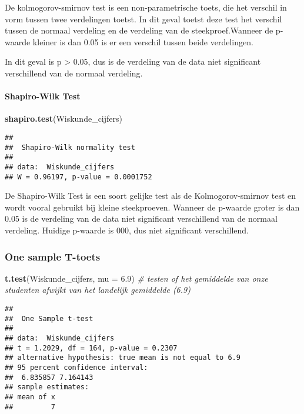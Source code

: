 \documentclass[]{article}
\newenvironment{Shaded}{\begin{snugshade}}{\end{snugshade}}
\newcommand{\CommentTok}[1]{\textcolor[rgb]{0.56,0.35,0.01}{\textit{#1}}}
\newcommand{\DataTypeTok}[1]{\textcolor[rgb]{0.13,0.29,0.53}{#1}}
\newcommand{\FloatTok}[1]{\textcolor[rgb]{0.00,0.00,0.81}{#1}}
\newcommand{\KeywordTok}[1]{\textcolor[rgb]{0.13,0.29,0.53}{\textbf{#1}}}
\newcommand{\NormalTok}[1]{#1}
\let\oldparagraph\paragraph
\renewcommand{\paragraph}[1]{\oldparagraph{#1}\mbox{}}
\begin{document}
De kolmogorov-smirnov test is een non-parametrische toets, die het
verschil in vorm tussen twee verdelingen toetst. In dit geval toetst
deze test het verschil tussen de normaal verdeling en de verdeling van
de steekproef.Wanneer de p-waarde kleiner is dan 0.05 is er een verschil
tussen beide verdelingen.

In dit geval is p \textgreater{} 0.05, dus is de verdeling van de data
niet significant verschillend van de normaal verdeling.

\hypertarget{shapiro-wilk-test}{%
\paragraph{Shapiro-Wilk Test}\label{shapiro-wilk-test}}

\begin{Shaded}
\begin{Highlighting}[]
\KeywordTok{shapiro.test}\NormalTok{(Wiskunde_cijfers)}
\end{Highlighting}
\end{Shaded}

\begin{verbatim}
## 
##  Shapiro-Wilk normality test
## 
## data:  Wiskunde_cijfers
## W = 0.96197, p-value = 0.0001752
\end{verbatim}

De Shapiro-Wilk Test is een soort gelijke test als de Kolmogorov-smirnov
test en wordt vooral gebruikt bij kleine steekproeven. Wanneer de
p-waarde groter is dan 0.05 is de verdeling van de data niet significant
verschillend van de normaal verdeling. Huidige p-waarde is 000, dus niet
significant verschillend.

\hypertarget{one-sample-t-toets}{%
\subsubsection{One sample T-toets}\label{one-sample-t-toets}}

\begin{Shaded}
\begin{Highlighting}[]
\KeywordTok{t.test}\NormalTok{(Wiskunde_cijfers, }\DataTypeTok{mu =} \FloatTok{6.9}\NormalTok{) }\CommentTok{# testen of het gemiddelde van onze studenten afwijkt van het landelijk gemiddelde (6.9)}
\end{Highlighting}
\end{Shaded}

\begin{verbatim}
## 
##  One Sample t-test
## 
## data:  Wiskunde_cijfers
## t = 1.2029, df = 164, p-value = 0.2307
## alternative hypothesis: true mean is not equal to 6.9
## 95 percent confidence interval:
##  6.835857 7.164143
## sample estimates:
## mean of x 
##         7
\end{verbatim}
\end{document}
